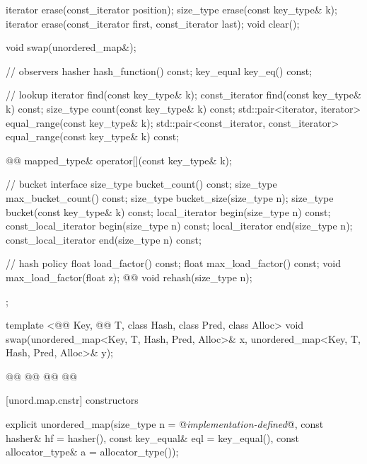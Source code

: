 \documentclass[american,twoside]{book}
\begin{document}
\begin{codeblock}
{{    iterator erase(const_iterator position);
    size_type erase(const key_type& k);
    iterator erase(const_iterator first, const_iterator last);
    void clear();

    void swap(unordered_map&);

    // observers
    hasher hash_function() const;
    key_equal key_eq() const;

    // lookup
    iterator       find(const key_type& k);
    const_iterator find(const key_type& k) const;
    size_type count(const key_type& k) const;
    std::pair<iterator, iterator>             equal_range(const key_type& k);
    std::pair<const_iterator, const_iterator> equal_range(const key_type& k) const;

    @@ 
      mapped_type& operator[](const key_type& k);

    // bucket interface
    size_type bucket_count() const;
    size_type max_bucket_count() const;
    size_type bucket_size(size_type n);
    size_type bucket(const key_type& k) const;
    local_iterator begin(size_type n) const;
    const_local_iterator begin(size_type n) const;
    local_iterator end(size_type n);
    const_local_iterator end(size_type n) const;  

    // hash policy
    float load_factor() const;
    float max_load_factor() const;
    void max_load_factor(float z);
    @@ void rehash(size_type n);
  };

  template <@@ Key, @@ T, class Hash, class Pred, class Alloc>
    void swap(unordered_map<Key, T, Hash, Pred, Alloc>& x,
              unordered_map<Key, T, Hash, Pred, Alloc>& y);

  @@
    @@
      @@
        @@
}
\end{codeblock}

[unord.map.cnstr]{ constructors}

%
\begin{itemdecl}
explicit unordered_map(size_type n = @\textit{implementation-defined}@,
                       const hasher& hf = hasher(),
                       const key_equal& eql = key_equal(),
                       const allocator_type& a = allocator_type());
\end{itemdecl}
\end{document}

